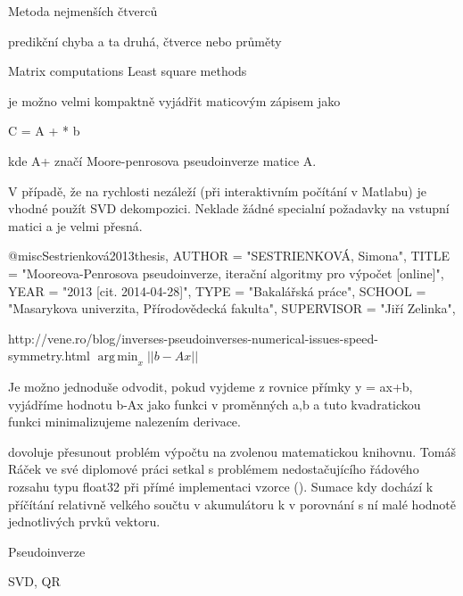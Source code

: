 Metoda nejmenších čtverců

predikční chyba a ta druhá, čtverce nebo průměty

Matrix computations Least square methods

je možno velmi kompaktně vyjádřit maticovým zápisem jako 

C = A + * b

kde A+ značí Moore-penrosova pseudoinverze matice A.

V případě, že na rychlosti nezáleží (při interaktivním počítání v Matlabu) je vhodné použít SVD dekompozici. Neklade žádné specialní požadavky na vstupní matici a je velmi přesná.

@misc{Sestrienková2013thesis,
AUTHOR = "SESTRIENKOVÁ, Simona",
TITLE = "Mooreova-Penrosova pseudoinverze, iterační algoritmy pro výpočet [online]",
YEAR = "2013 [cit. 2014-04-28]",
TYPE = "Bakalářská práce", 
SCHOOL = "Masarykova univerzita, Přírodovědecká fakulta",
SUPERVISOR = "Jiří Zelinka", 
}

http://vene.ro/blog/inverses-pseudoinverses-numerical-issues-speed-symmetry.html
\(\operatorname{arg\,min}_x ||b - Ax||\)

Je možno jednoduše odvodit, pokud vyjdeme z rovnice přímky y = ax+b, vyjádříme hodnotu b-Ax jako funkci v proměnných a,b a tuto kvadratickou funkci minimalizujeme nalezením derivace.

dovoluje přesunout problém výpočtu na zvolenou matematickou knihovnu. Tomáš Ráček ve své diplomové práci setkal s problémem nedostačujícího řádového rozsahu typu float32 při přímé implementaci vzorce (). Sumace kdy dochází k příčítání relativně velkého součtu v akumulátoru k v porovnání s ní malé hodnotě jednotlivých prvků vektoru.

Pseudoinverze

SVD, QR

